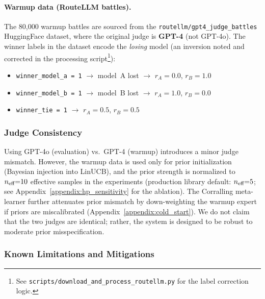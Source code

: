 \paragraph{Warmup data (RouteLLM battles).}
The 80,000 warmup battles are sourced from the
\texttt{routellm/gpt4\_judge\_battles} HuggingFace dataset, where the
original judge is \textbf{GPT-4} (not GPT-4o).  The winner labels in the
dataset encode the \emph{losing} model (an inversion noted and corrected in
the processing script\footnote{See
\texttt{scripts/download\_and\_process\_routellm.py} for the label correction
logic.}):
\begin{itemize}[leftmargin=*,noitemsep]
    \item \texttt{winner\_model\_a = 1} $\to$ model~A lost $\to$ $r_A = 0.0$,
          $r_B = 1.0$
    \item \texttt{winner\_model\_b = 1} $\to$ model~B lost $\to$ $r_A = 1.0$,
          $r_B = 0.0$
    \item \texttt{winner\_tie = 1} $\to$ $r_A = 0.5$, $r_B = 0.5$
\end{itemize}

\subsubsection{Judge Consistency}

Using GPT-4o (evaluation) vs.\ GPT-4 (warmup) introduces a minor judge
mismatch.  However, the warmup data is used only for prior initialization
(Bayesian injection into LinUCB), and the prior strength is
normalized to $n_{\text{eff}}{=}10$ effective samples in the experiments
(production library default: $n_{\text{eff}}{=}5$;
see Appendix~\ref{appendix:hp_sensitivity} for the ablation).  The Corralling meta-learner
further attenuates prior mismatch by down-weighting the warmup expert if
priors are miscalibrated (Appendix~\ref{appendix:cold_start}).  We do not
claim that the two judges are identical; rather, the system is designed to be
robust to moderate prior misspecification.

\subsubsection{Known Limitations and Mitigations}

